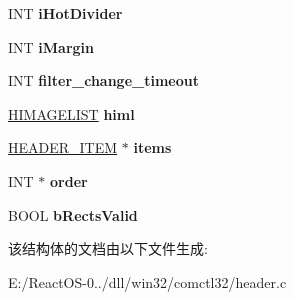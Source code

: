\begin{DoxyCompactItemize}
\mbox{\label{struct_h_e_a_d_e_r___i_n_f_o_a9e0fe80854c9daf1a623734c2c8f920c}} 
I\+NT {\bfseries i\+Hot\+Divider}
\item 
\mbox{\label{struct_h_e_a_d_e_r___i_n_f_o_a711896e8b5c9d08e7bde8ede5fdf2ff9}} 
I\+NT {\bfseries i\+Margin}
\item 
\mbox{\label{struct_h_e_a_d_e_r___i_n_f_o_ae0396866ef820cbbfb7b43b1614882eb}} 
I\+NT {\bfseries filter\+\_\+change\+\_\+timeout}
\item 
\mbox{\label{struct_h_e_a_d_e_r___i_n_f_o_ac908120d5b24ae61b8e0983094885703}} 
\hyperlink{struct___i_m_a_g_e_l_i_s_t}{H\+I\+M\+A\+G\+E\+L\+I\+ST} {\bfseries himl}
\item 
\mbox{\label{struct_h_e_a_d_e_r___i_n_f_o_ac5ff3f661bdedfa2a8a2168a0648735d}} 
\hyperlink{struct_h_e_a_d_e_r___i_t_e_m}{H\+E\+A\+D\+E\+R\+\_\+\+I\+T\+EM} $\ast$ {\bfseries items}
\item 
\mbox{\label{struct_h_e_a_d_e_r___i_n_f_o_a2d8da0d8bd5f9b07c6622bd7fb6d637d}} 
I\+NT $\ast$ {\bfseries order}
\item 
\mbox{\label{struct_h_e_a_d_e_r___i_n_f_o_af3b9051a60a6f1752ed162a9c7778cb4}} 
B\+O\+OL {\bfseries b\+Rects\+Valid}
\end{DoxyCompactItemize}


该结构体的文档由以下文件生成\+:\begin{DoxyCompactItemize}
\item 
E\+:/\+React\+O\+S-\/0../dll/win32/comctl32/header.\+c\end{DoxyCompactItemize}
